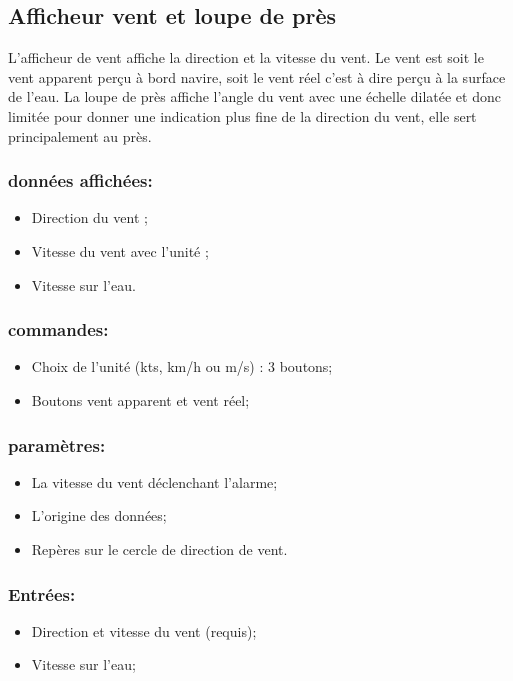 \documentclass[a4paper,11pt]{report}
\begin{document}
\subsection{Afficheur vent et loupe de près}
L'afficheur de vent affiche la direction et la vitesse du vent.
Le vent est soit le vent apparent perçu à bord navire,
soit le vent réel c'est à dire perçu à la surface de l'eau.
La loupe de près affiche l'angle du vent avec une échelle dilatée
et donc limitée pour donner une indication plus fine de la direction du vent,
elle sert principalement au près.
\paragraph{}


\subsubsection{données affichées:}
\begin{itemize}
	\item Direction du vent ;
	\item Vitesse du vent avec l'unité ;
    \item Vitesse sur l'eau.
\end{itemize}

\subsubsection{commandes:}
\begin{itemize}
	\item Choix de l'unité (kts, km/h ou m/s) : 3 boutons;
	\item Boutons vent apparent et vent réel;
\end{itemize}

\subsubsection{paramètres:}
\begin{itemize}
	\item La vitesse du vent déclenchant l'alarme;
	\item L'origine des données;
	\item Repères sur le cercle de direction de vent.
\end{itemize}

\subsubsection{Entrées:}
\begin{itemize}
	\item Direction et vitesse du vent (requis);
	\item Vitesse sur l'eau;
\end{itemize}
\end{document}
